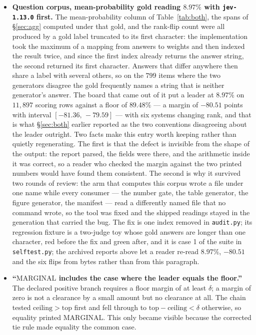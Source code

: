 \documentclass{article}
\newcommand{\ids}[1]{\texttt{\small #1}} %
\begin{document}
\begin{itemize}
\item \textbf{Question corpus, mean-probability gold reading $8.97\%$ with \ids{jev-1.13.0} first.}
The mean-probability column of Table~\ref{tab:both}, the spans of \S\ref{sec:agg} computed under that gold, and the
rank-flip count were all produced by a gold label truncated to its first character: the implementation took the
maximum of a mapping from answers to weights and then indexed the result twice, and since the first index already
returns the answer string, the second returned its first character. Answers that differ anywhere then share a
label with several others, so on the $799$ items where the two generators disagree the gold frequently names a
string that is neither generator's answer. The board that came out of it put a leader at $8.97\%$ on $11,897$
scoring rows against a floor of $89.48\%$ --- a margin of $-80.51$ points with interval $[-81.36,\,-79.59]$ --- with
six systems changing rank, and that is what \S\ref{sec:both} earlier reported as the two conventions disagreeing
about the leader outright. Two facts make this entry worth keeping rather than quietly regenerating. The first
is that the defect is invisible from the shape of the output: the report parsed, the fields were there, and the
arithmetic inside it was correct, so a reader who checked the margin against the two printed numbers would have
found them consistent. The second is why it survived two rounds of review: the arm that computes this corpus wrote
a file under one name while every consumer --- the number gate, the table generator, the figure generator, the
manifest --- read a differently named file that no command wrote, so the tool was fixed and the shipped readings
stayed in the generation that carried the bug. The fix is one index removed in \ids{audit.py}; its regression
fixture is a two-judge toy whose gold answers are longer than one character, red before the fix and green after,
and it is case 1 of the suite in \ids{selftest.py}; the archived reports above let a reader re-read $8.97\%$,
$-80.51$ and the six flips from bytes rather than from this paragraph.
\item \textbf{``$\mathrm{MARGINAL}$ includes the case where the leader equals the floor.''} The declared positive branch requires a floor margin of at least $\delta$; a margin of zero is not a clearance by a small amount but no clearance at all. The chain tested $\mathrm{ceiling} > \mathrm{top}$ first and fell through to $\mathrm{top} - \mathrm{ceiling} < \delta$ otherwise, so equality printed $\mathrm{MARGINAL}$. This only became visible because the corrected tie rule made equality the common case.
\end{itemize}
\end{document}
